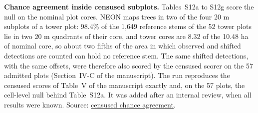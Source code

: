 \documentclass[10pt]{article}
\begin{document}
\textbf{Chance agreement inside censused subplots.} Tables~S12a to S12g score the
null on the nominal plot cores. NEON maps trees in two of the four 20 m subplots
of a tower plot: 98.4\% of the 1,649 reference stems of the 52 tower plots lie in
two 20 m quadrants of their core, and tower cores are 8.32 of the 10.48 ha of
nominal core, so about two fifths of the area in which observed and shifted
detections are counted can hold no reference stem. The same shifted detections,
with the same offsets, were therefore also scored by the censused scorer on the
57 admitted plots (Section~IV-C of the manuscript). The run reproduces the
censused scores of Table~V of the manuscript exactly and, on the 57 plots, the
cell-level null behind Table~S12a. It was added after an internal review, when
all results were known. Source: \href{https://github.com/devakellc/lidar-tree-benchmark/blob/main/results/censused-chance-agreement-results.md}{censused chance
agreement}.
\end{document}
